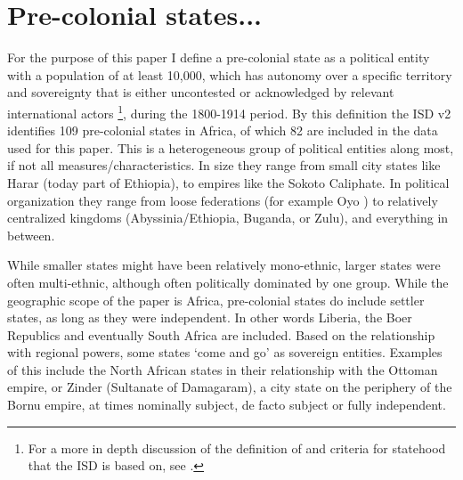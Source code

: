 \documentclass[12pt]{article}
\begin{document}
% 
% 
% 
% 
% 
% 
% 

\section{Pre-colonial states...}

For the purpose of this paper I define a pre-colonial state as a political
entity with a population of at least 10,000, which has autonomy over a specific
territory and sovereignty that is either uncontested or acknowledged by relevant
international actors \citep{Butcher2020}\footnote{For a more in depth discussion
of the definition of and criteria for statehood that the ISD is based on, see
\citet{Butcher2017}.}, during the 1800-1914 period. By this definition the ISD
v2 identifies 109 pre-colonial states in Africa, of which 82 are included in the
data used for this paper. This is a heterogeneous group of political entities
along most, if not all measures/characteristics. In size they range from small
city states like Harar (today part of Ethiopia), to empires like the Sokoto
Caliphate. In political organization they range from loose federations (for
example Oyo \citep{Law1977}) to relatively centralized kingdoms (Abyssinia/Ethiopia,
Buganda, or Zulu), and everything in between. 

While smaller states might have been relatively mono-ethnic, larger states were
often multi-ethnic, although often politically dominated by one group. While the
geographic scope of the paper is Africa, pre-colonial states do include settler
states, as long as they were independent. In other words Liberia, the Boer
Republics and eventually South Africa are included. Based on the relationship
with regional powers, some states `come and go' as sovereign entities. Examples
of this include the North African states in their relationship with the Ottoman
empire, or Zinder (Sultanate of Damagaram), a city state on the periphery of the
Bornu empire, at times nominally subject, de facto subject or fully independent. 
\end{document}
